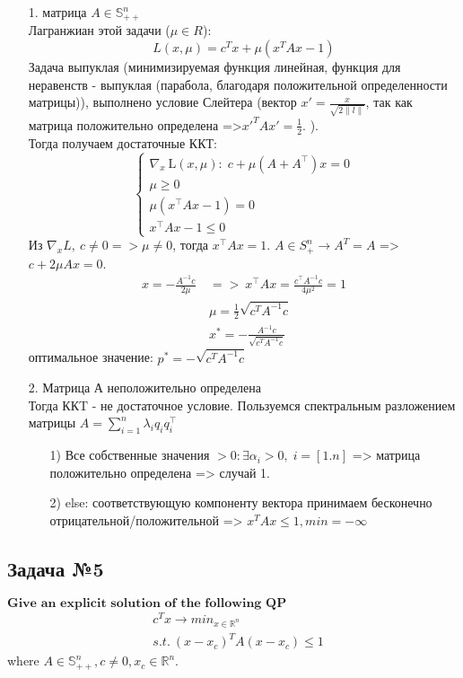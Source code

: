 \documentclass[12pt,letterpaper]{article}
\begin{document}
\begin{itemize}
	\item[1.] матрица $A \in \mathbb{S}_{++}^{n} $\\
Лагранжиан этой задачи ($ \mu \in R $):
$$L(x, \mu)=c^{T} x+\mu\left(x^{T} A x-1\right)$$
Задача выпуклая (минимизируемая функция линейная, функция для неравенств - выпуклая (парабола, благодаря положительной определенности матрицы)), выполнено условие Слейтера (вектор $ x' = \frac{x}{ \sqrt{2 \| l \|}} $, так как матрица положительно определена =>$ x'^T A x' = \frac{1}{2} $. ).\\
Тогда получаем достаточные ККТ:
$$
\left\{\begin{array}{l}
\nabla_{x} \mathrm{~L}(x, \mu): \; c+\mu\left(A+A^{\top}\right) x=0 \\
\mu \geqslant 0 \\
\mu\left(x^{\top} A x-1\right)=0 \\
x^{\top} A x-1 \leqslant 0
\end{array}\right.
$$
Из $\nabla_{x}L,\ c\neq0 => \mu\neq0$, тогда $x^{\top} A x=1$. $ A \in S^n_+ \rightarrow A^T = A $ => $c+2 \mu A x=0$.\\
$$\begin{aligned}
x=-\frac{A^{-1} c}{2 \mu}\ &=> \ x^{\top} A x=\frac{c^{\top} A^{-1} c}{4 \mu^{2}}=1 \\
&\mu=\frac{1}{2} \sqrt{c^{T} A^{-1} c}\\
&x^{*}=-\frac{A^{-1} c}{\sqrt{c^{T} A^{-1} c}}
\end{aligned}$$
оптимальное значение: $ p^* = -\sqrt{c^{T} A^{-1} c} $
	\item[2.] Матрица А неположительно определена\\
Тогда ККT - не достаточное условие. Пользуемся спектральным разложением матрицы $A=\sum\limits_{i=1}^{n} \lambda_{i} q_{i} q_{i}^{\top}$\\
	\begin{itemize}
		\item[1)] Все собственные значения $> 0: \exists \alpha_{i}>0, \; i = [1. n]$ => матрица положительно определена => случай 1.
		\item[2)] else: соответствующую компоненту вектора принимаем бесконечно отрицательной/положительной => $ x^T A x \leq 1, min = -\infty $
	\end{itemize}
\end{itemize}

\subsection*{Задача №5}
$\textbf{Give an explicit solution of the following QP}$
$$\begin{aligned}
&c^Tx\rightarrow min_{x\in \mathbb{R}^n}\\ 
&s.t.\ (x-x_{c})^TA(x-x_c)\leq1
\end{aligned} $$
where \(A \in \mathbb{S}^n_{++}, c \neq 0, x_c \in \mathbb{R}^n\).\\
\end{document}
